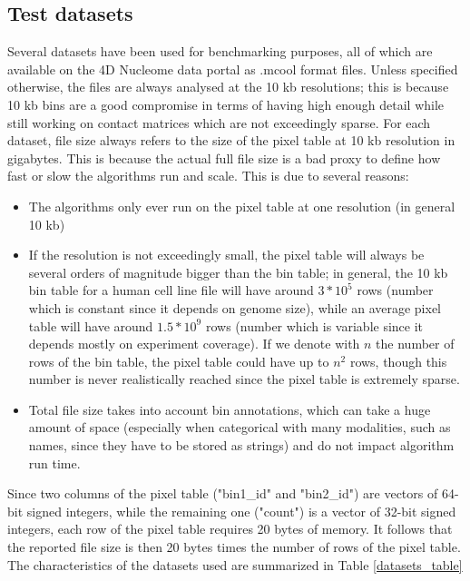 \subsection{Test datasets}
Several datasets have been used for benchmarking purposes, all of which are available on the 4D Nucleome data portal \cite{4dn2022} as .mcool format files. Unless specified otherwise, the files are always analysed at the 10 kb resolutions; this is because 10 kb bins are a good compromise in terms of having high enough detail while still working on contact matrices which are not exceedingly sparse. 
For each dataset, file size always refers to the size of the pixel table at 10 kb resolution in gigabytes. This is because the actual full file size is a bad proxy to define how fast or slow the algorithms run and scale. This is due to several reasons: 
\begin{itemize}\tightlist
  \item The algorithms only ever run on the pixel table at one resolution (in general 10 kb)
  \item If the resolution is not exceedingly small, the pixel table will always be several orders of magnitude bigger than the bin table; in general, the 10 kb bin table for a human cell line file will have around $3 * 10^5$ rows (number which is constant since it depends on genome size), while an average pixel table will have around $1.5 * 10^9$ rows (number which is variable since it depends mostly on experiment coverage). If we denote with $n$ the number of rows of the bin table, the pixel table could have up to $n^2$ rows, though this number is never realistically reached since the pixel table is extremely sparse.
  \item Total file size takes into account bin annotations, which can take a huge amount of space (especially when categorical with many modalities, such as names, since they have to be stored as strings) and do not impact algorithm run time.
\end{itemize}
Since two columns of the pixel table ("bin1\_id" and "bin2\_id") are vectors of 64-bit signed integers, while the remaining one ("count") is a vector of 32-bit signed integers, each row of the pixel table requires 20 bytes of memory. It follows that the reported file size is then 20 bytes times the number of rows of the pixel table.
The characteristics of the datasets used are summarized in Table \ref{datasets_table}

